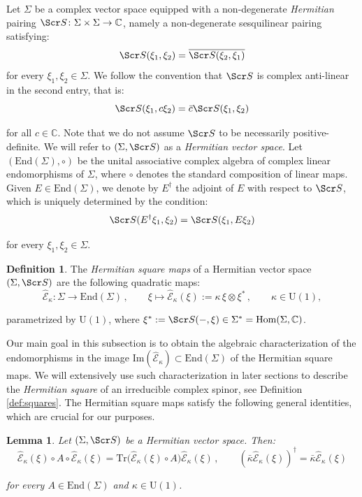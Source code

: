 \documentclass[10pt,a4paper,twoside,reqno]{amsart}
\theoremstyle{plain}
\newtheorem{lemma}[thm]{Lemma}
\theoremstyle{definition}
\newtheorem{definition}[thm]{Definition}
\theoremstyle{remark}
\newcommand{\End}{\mathrm{End}}
\def\C{\mathbb{C}}
\newcommand{\Tr}{\mathrm{Tr}}
\def\scS{\Scr S}
\def\U{\mathrm{U}}
\def\hcE{\widehat{\mathcal{E}}}
\newcommand{\Hom}{{\rm Hom}}
\def\Im{\mathrm{Im}}
\begin{document}
Let $\Sigma$ be a complex vector space equipped with a non-degenerate \emph{Hermitian} pairing $\scS\colon\Sigma\times\Sigma\to\C$, namely a non-degenerate sesquilinear pairing satisfying: $$\scS(\xi_1 , \xi_2) = \overline{\scS(\xi_2 , \xi_1)}$$ for every $\xi_1 , \xi_2 \in \Sigma$. We follow the convention that $\scS$ is complex anti-linear in the second entry, that is:
\begin{equation*}
\scS(\xi_1,c\xi_2)=\bar{c}\scS(\xi_1,\xi_2)
\end{equation*}

\noindent
for all $c\in\C$. Note that we do not assume $\scS$ to be necessarily positive-definite. We will refer to $(\Sigma,\scS)$ as a \emph{Hermitian vector space}. Let $(\End(\Sigma) , \circ)$ be the unital associative complex algebra of complex linear endomorphisms of $\Sigma$, where $\circ$ denotes the standard composition of linear maps. Given $E\in\End(\Sigma)$, we denote by $E^\dagger$ the adjoint of $E$ with respect to $\scS$, which is uniquely determined by the condition: 
\begin{equation*}
\scS(E^\dagger\xi_1,\xi_2)=\scS(\xi_1,E\xi_2)    
\end{equation*}

\noindent
for every $\xi_1 , \xi_2 \in \Sigma$.

\begin{definition}
The \emph{Hermitian square maps} of a Hermitian vector space $(\Sigma,\scS)$ are the following quadratic maps:
\begin{equation*}
\hcE_\kappa\colon\Sigma\to\End(\Sigma)\, , \qquad \xi\mapsto \hcE_\kappa(\xi):=\kappa\,\xi\otimes\xi^{\ast}\, , \qquad \kappa\in \U(1),
\end{equation*}

\noindent
parametrized by $\U(1)$, where $\xi^* := \scS(-,\xi)\in\Sigma^{\ast} = \Hom(\Sigma,\C)$.
\end{definition}

\noindent
Our main goal in this subsection is to obtain the algebraic characterization of the endomorphisms in the image $\Im(\hcE_\kappa)\subset \End(\Sigma)$ of the Hermitian square maps. We will extensively use such characterization in later sections to describe the \emph{Hermitian square} of an irreducible complex spinor, see Definition \ref{def:squares}. The Hermitian square maps satisfy the following general identities, which are crucial for our purposes.

\begin{lemma}
\label{lemma:properties_cE}
Let $(\Sigma,\scS)$ be a Hermitian vector space. Then:
\begin{equation*}
\hcE_\kappa(\xi)\circ A \circ \hcE_\kappa(\xi) =\Tr\big(\hcE_\kappa(\xi)\circ A \big)\hcE_\kappa(\xi)\, , \qquad (\bar\kappa \hcE_\kappa(\xi))^\dagger = \bar\kappa \hcE_\kappa(\xi)
\end{equation*}

\noindent
for every $A\in \End(\Sigma)$ and $\kappa \in \U(1)$.
\end{lemma}
\end{document}
